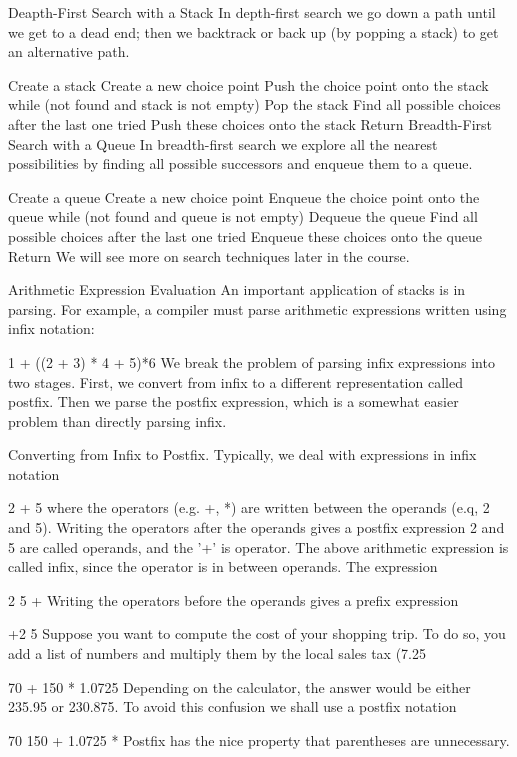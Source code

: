Deapth-First Search with a Stack
In depth-first search we go down a path until we get to a dead end; then we backtrack or back up (by popping a stack) to get an alternative path.

Create a stack
Create a new choice point
Push the choice point onto the stack
while (not found and stack is not empty)
    Pop the stack
    Find all possible choices after the last one tried
    Push these choices onto the stack
Return
Breadth-First Search with a Queue
In breadth-first search we explore all the nearest possibilities by finding all possible successors and enqueue them to a queue.

Create a queue
Create a new choice point
Enqueue the choice point onto the queue
while (not found and queue is not empty)
    Dequeue the queue
    Find all possible choices after the last one tried
    Enqueue these choices onto the queue
Return
We will see more on search techniques later in the course.

Arithmetic Expression Evaluation
An important application of stacks is in parsing. For example, a compiler must parse arithmetic expressions written using infix notation:

1 + ((2 + 3) * 4 + 5)*6
We break the problem of parsing infix expressions into two stages. First, we convert from infix to a different representation called postfix. Then we parse the postfix expression, which is a somewhat easier problem than directly parsing infix.

Converting from Infix to Postfix. Typically, we deal with expressions in infix notation

2 + 5
where the operators (e.g. +, *) are written between the operands (e.q, 2 and 5). Writing the operators after the operands gives a postfix expression 2 and 5 are called operands, and the '+' is operator. The above arithmetic expression is called infix, since the operator is in between operands. The expression

2 5 +
Writing the operators before the operands gives a prefix expression

+2 5
Suppose you want to compute the cost of your shopping trip. To do so, you add a list of numbers and multiply them by the local sales tax (7.25%

70 + 150 * 1.0725
Depending on the calculator, the answer would be either 235.95 or 230.875. To avoid this confusion we shall use a postfix notation

70  150 + 1.0725 *
Postfix has the nice property that parentheses are unnecessary.

